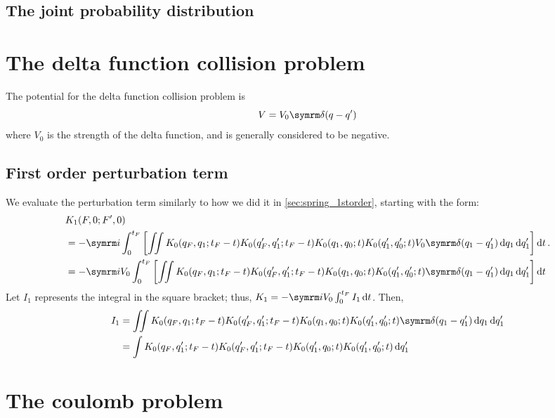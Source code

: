 \subsection{The joint probability distribution}

\section{The delta function collision problem}

The potential for the delta function collision problem is
\begin{equation}
    V = V_0\ddel(q - q')
\end{equation}
where $V_0$ is the strength of the delta function, and is generally considered to be negative.

\subsection{First order perturbation term}

We evaluate the perturbation term similarly to how we did it in \cref{sec:spring_1storder}, starting with the form:
\begin{align}
    &K_1(F, 0; F', 0) \\
    &= -\im\int_0^{t_F}\left[\iint K_0(q_F, q_1; t_F - t)K_0(q_F', q_1'; t_F - t)K_0(q_1, q_0; t)K_0(q_1', q_0'; t)V_0\ddel(q_1 - q_1')\dd{q_1}\dd{q_1'}\right]\dd{t}. \nonumber \\
    &= -\im V_0\int_0^{t_F}\left[\iint K_0(q_F, q_1; t_F - t)K_0(q_F', q_1'; t_F - t)K_0(q_1, q_0; t)K_0(q_1', q_0'; t)\ddel(q_1 - q_1')\dd{q_1}\dd{q_1'}\right]\dd{t} \nonumber
\end{align}
Let $I_1$ represents the integral in the square bracket; thus, $K_1 = -\im V_0\int_{0}^{t_F}I_1\dd{t}$. Then,
\begin{align}
    I_1 &= \iint K_0(q_F, q_1; t_F - t)K_0(q_F', q_1'; t_F - t)K_0(q_1, q_0; t)K_0(q_1', q_0'; t)\ddel(q_1 - q_1')\dd{q_1}\dd{q_1'} \\
    &= \int K_0(q_F, q_1'; t_F - t)K_0(q_F', q_1'; t_F - t)K_0(q_1', q_0; t)K_0(q_1', q_0'; t)\dd{q_1'}
\end{align}

\section{The coulomb problem}